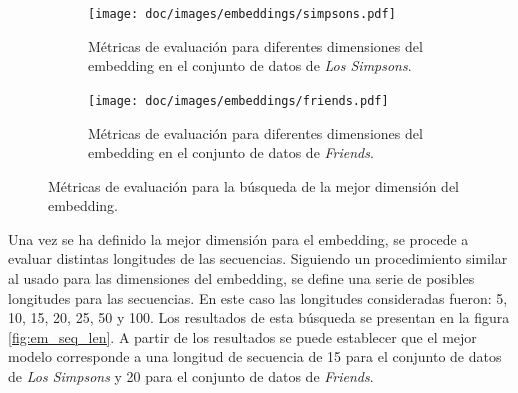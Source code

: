 \begin{figure}[H]
    \centering
    \begin{subfigure}[b]{0.45\textwidth}
        \centering
        \texttt{[image: doc/images/embeddings/simpsons.pdf]}
        \caption{Métricas de evaluación para diferentes dimensiones del embedding en el conjunto de datos de \textit{Los Simpsons}.}
        \label{fig:em_embedding_simpsons}
    \end{subfigure}
    \hfill
    \begin{subfigure}[b]{0.45\textwidth}
        \centering
        \texttt{[image: doc/images/embeddings/friends.pdf]}
        \caption{Métricas de evaluación para diferentes dimensiones del embedding en el conjunto de datos de \textit{Friends}.}
        \label{fig:em_embedding_friends}
    \end{subfigure}
    \caption{Métricas de evaluación para la búsqueda de la mejor dimensión del embedding.}
    \label{fig:em_embedding}
\end{figure}

Una vez se ha definido la mejor dimensión para el embedding, se procede a evaluar distintas longitudes de las secuencias. Siguiendo un procedimiento similar al usado para las dimensiones del embedding, se define una serie de posibles longitudes para las secuencias. En este caso las longitudes consideradas fueron: 5, 10, 15, 20, 25, 50 y 100. Los resultados de esta búsqueda se presentan en la figura \ref{fig:em_seq_len}. A partir de los resultados se puede establecer que el mejor modelo corresponde a una longitud de secuencia de 15 para el conjunto de datos de \textit{Los Simpsons} y 20 para el conjunto de datos de \textit{Friends}.

